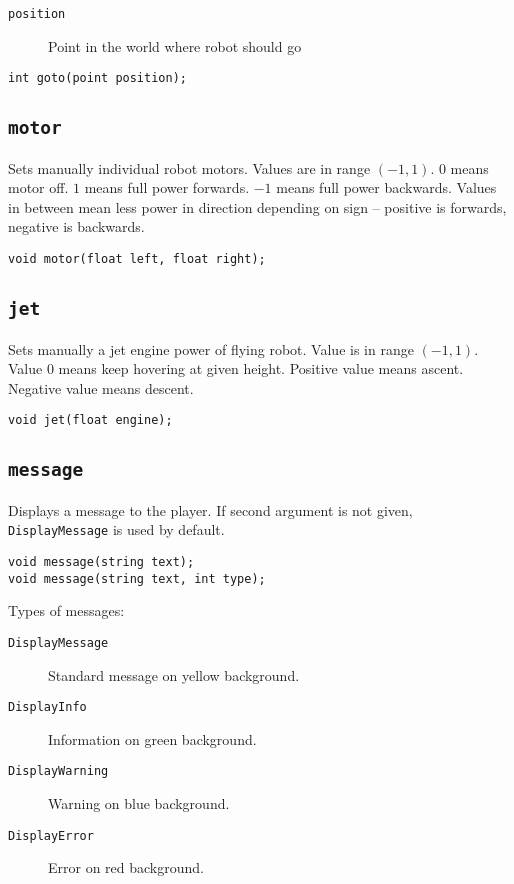 \begin{description}
    \item[\texttt{position}] Point in the world where robot should go
\end{description}

\begin{lstlisting}
int goto(point position);
\end{lstlisting}


\subsection{\texttt{motor}}
Sets manually individual robot motors. Values are in range $(-1, 1)$. $0$ means motor off. $1$ means full power forwards. $-1$ means full power backwards. Values in between mean less power in direction depending on sign -- positive is forwards, negative is backwards.

\begin{lstlisting}
void motor(float left, float right);
\end{lstlisting}


\subsection{\texttt{jet}}
Sets manually a jet engine power of flying robot. Value is in range $(-1, 1)$. Value $0$ means keep hovering at given height. Positive value means ascent. Negative value means descent.

\begin{lstlisting}
void jet(float engine);
\end{lstlisting}


\subsection{\texttt{message}}
Displays a message to the player. If second argument is not given, \texttt{DisplayMessage} is used by default.

\begin{lstlisting}
void message(string text);
void message(string text, int type);
\end{lstlisting}

Types of messages:

\begin{description}
    \item[\texttt{DisplayMessage}] Standard message on yellow background.
    \item[\texttt{DisplayInfo}] Information on green background.
    \item[\texttt{DisplayWarning}] Warning on blue background.
    \item[\texttt{DisplayError}] Error on red background.
\end{description}


